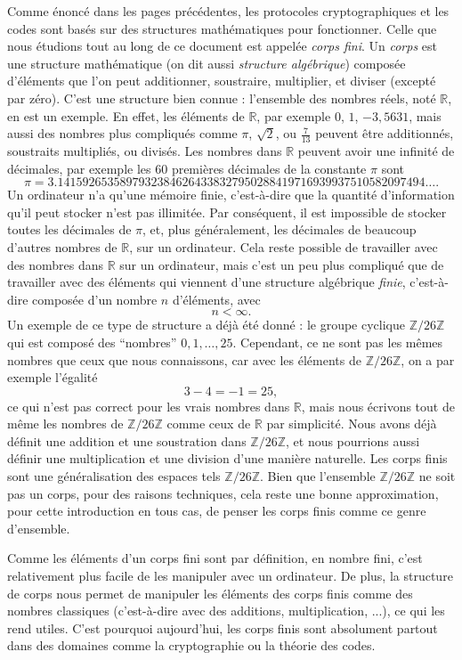 Comme énoncé dans les pages précédentes, les protocoles cryptographiques et les
codes sont basés sur des structures mathématiques pour fonctionner. Celle que
nous étudions tout au long de ce document est appelée \emph{corps fini}. Un
\emph{corps} est une structure mathématique (on dit aussi \emph{structure
algébrique}) composée d'éléments que l'on peut additionner, soustraire,
multiplier, et diviser (excepté par zéro). C'est une structure bien connue :
l'ensemble des nombres réels, noté $\mathbb{R}$, en est un exemple. En effet,
les éléments de $\mathbb{R}$, par exemple $0$, $1$, $-3,5631$, mais aussi des
nombres plus compliqués comme $\pi$, $\sqrt2$, ou $\frac{7}{13}$ peuvent être
additionnés, soustraits multipliés, ou divisés. Les nombres dans $\mathbb{R}$
peuvent avoir une infinité de décimales, par exemple les $60$ premières
décimales de la constante $\pi$ sont
\[
  \pi = 3.14159265358979323846264338327950288419716939937510582097494\dots.
\]
Un ordinateur n'a qu'une mémoire finie, c'est-à-dire que la quantité
d'information qu'il peut stocker n'est pas illimitée. Par conséquent, il est
impossible de stocker toutes les décimales de $\pi$, et, plus généralement, les
décimales de beaucoup d'autres nombres de $\mathbb{R}$, sur un ordinateur. Cela
reste possible de travailler avec des nombres dans $\mathbb{R}$ sur un
ordinateur, mais c'est un peu plus compliqué que de travailler avec des éléments
qui viennent d'une structure algébrique \emph{finie}, c'est-à-dire composée d'un
nombre $n$ d'éléments, avec 
\[
  n < \infty.
\]
Un exemple de ce type de structure a déjà été donné : le groupe cyclique
$\mathbb{Z}/26\mathbb{Z}$ qui est composé des ``nombres'' $0, 1, \dots, 25$.
Cependant, ce ne sont pas les mêmes nombres que ceux que nous connaissons, car
avec les éléments de $\mathbb{Z}/26\mathbb{Z}$, on a par exemple l'égalité
\[
  3-4 = -1 = 25,
\]
ce qui n'est pas correct pour les vrais nombres dans $\mathbb{R}$, mais nous
écrivons tout de même les nombres de $\mathbb{Z}/26\mathbb{Z}$ comme ceux de
$\mathbb{R}$ par simplicité. Nous avons déjà définit une addition et une
soustration dans $\mathbb{Z}/26\mathbb{Z}$, et nous pourrions aussi définir une
multiplication et une division d'une manière naturelle. Les corps finis sont une
généralisation des espaces tels $\mathbb{Z}/26\mathbb{Z}$. Bien que l'ensemble
$\mathbb{Z}/26\mathbb{Z}$ ne soit pas un corps, pour des raisons techniques,
cela reste une bonne approximation, pour cette introduction en tous cas, de
penser les corps finis comme ce genre d'ensemble.

Comme les éléments d'un corps fini sont par définition, en nombre fini, c'est
relativement plus facile de les manipuler avec un ordinateur. De plus, la
structure de corps nous permet de manipuler les éléments des corps finis comme
des nombres classiques (c'est-à-dire avec des additions, multiplication, ...),
ce qui les rend utiles. C'est pourquoi aujourd'hui, les corps finis sont
absolument partout dans des domaines comme la cryptographie ou la théorie des
codes.

